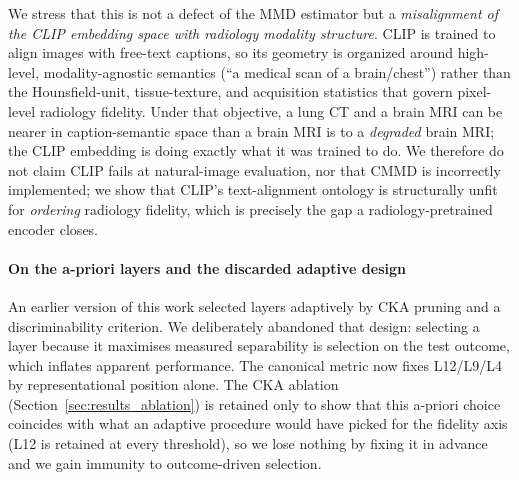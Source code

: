 \documentclass[lettersize,journal]{IEEEtran}
\begin{document}
We stress that this is not a defect of the MMD estimator but a
\emph{misalignment of the CLIP embedding space with radiology modality
structure}. CLIP is trained to align images with free-text captions, so its
geometry is organized around high-level, modality-agnostic semantics
(``a medical scan of a brain/chest'') rather than the Hounsfield-unit,
tissue-texture, and acquisition statistics that govern pixel-level radiology
fidelity. Under that objective, a lung CT and a brain MRI can be nearer in
caption-semantic space than a brain MRI is to a \emph{degraded} brain MRI; the
CLIP embedding is doing exactly what it was trained to do. We therefore do not
claim CLIP fails at natural-image evaluation, nor that CMMD is incorrectly
implemented; we show that CLIP's text-alignment ontology is structurally unfit
for \emph{ordering} radiology fidelity, which is precisely the gap a
radiology-pretrained encoder closes.

\paragraph{On the a-priori layers and the discarded adaptive design}
An earlier version of this work selected layers adaptively by CKA pruning
and a discriminability criterion. We deliberately abandoned that design:
selecting a layer because it maximises measured separability is selection on
the test outcome, which inflates apparent performance. The canonical metric
now fixes L12/L9/L4 by representational position alone. The CKA ablation
(Section~\ref{sec:results_ablation}) is retained only to show that this
a-priori choice coincides with what an adaptive procedure would have picked
for the fidelity axis (L12 is retained at every threshold), so we lose
nothing by fixing it in advance and we gain immunity to outcome-driven
selection.
\end{document}
